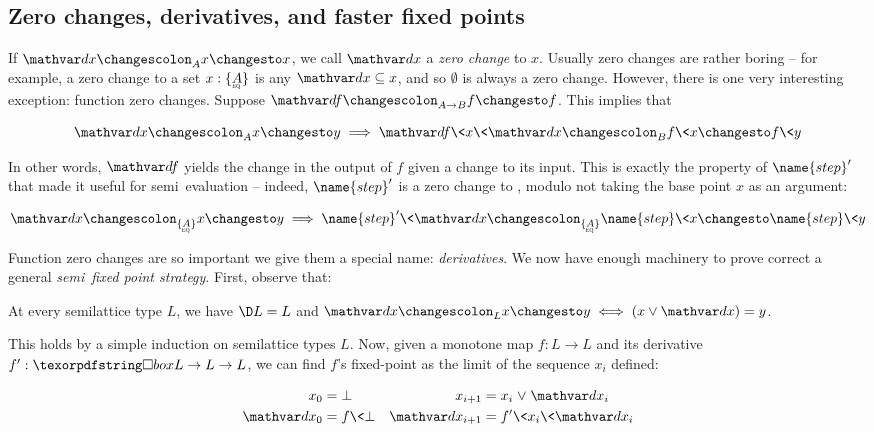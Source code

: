 
\subsection{Zero changes, derivatives, and faster fixed points}
\label{sec:derivatives}

If $\changesat A \dx x x$, we call $\dx$ a \emph{zero change} to $x$. Usually
zero changes are rather boring -- for example, a zero change to a set $x :
\tseteq{A}$ is any $\dx \subseteq x$, and so $\emptyset$ is always a zero
change.
%
However, there is one very interesting exception: function zero changes. Suppose
$\changesat{A \to B}{\df}{f}{f}$. This implies that

\begin{equation*}
  \changesat A \dx x y \implies \changesat B{\df\<x\<\dx}{f\<x}{f\<y}
\end{equation*}

\noindent
In other words, $\df$ yields the change in the output of $f$ given a change to
its input.
%
This is exactly the property of $\name{step}'$ that made it useful for
semi\naive\ evaluation -- indeed, $\name{step}'$ is a zero change to
, modulo not taking the base point $x$ as an argument:

\[ \changesat{\tseteq A} \dx x y \implies
\changesat{\tseteq A}{\name{step}'\<\dx}{\name{step}\<x}{\name{step}\<y}
\]

\noindent
Function zero changes are so important we give them a special name:
\emph{derivatives}. We now have enough machinery to prove correct a
general \emph{semi\naive\ fixed point strategy}. First, observe that:

\begin{lemma}\label{lem:DeltaL}
  At every semilattice type $L$, we have $\D L = L$ and
  $\changesat{L}{\dx}{x}{y} \iff (x \binvee \dx) = y$.
\end{lemma}


\noindent
This holds by a simple induction on semilattice types $L$. Now, given
a monotone map $f : L \to L$ and its derivative $f' : \iso L \to L \to
L$, we can find $f$'s fixed-point as the limit of the sequence $x_i$
defined:

\begin{align*}
  x_0 &= \bot & x_{i+1} &= x_i \vee \dx_i\\
  \dx_0 &= f\<\bot & \dx_{i+1} &= f'\<x_i\<\dx_i
\end{align*}


